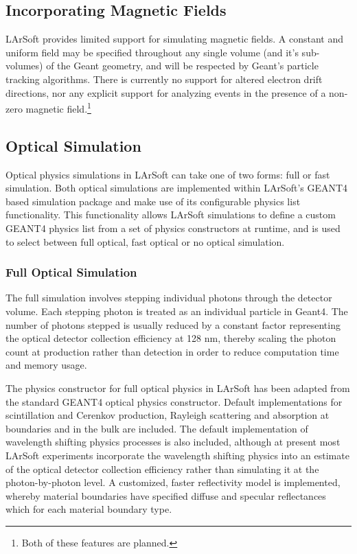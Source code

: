 \documentclass[12pt]{elsarticle}
\begin{document}
\subsection{Incorporating Magnetic Fields}
LArSoft provides limited support for simulating magnetic
fields. A constant and uniform field may be specified
throughout any single volume (and it's sub-volumes) of the Geant
geometry, and will be respected by Geant's particle tracking
algorithms. There is currently no support for altered electron
drift directions, nor any explicit support for analyzing events
in the presence of a non-zero magnetic field.\footnote{Both of these features are planned.}

\subsection{Optical Simulation}
Optical physics simulations in LArSoft can take one of two forms: full or fast simulation.  Both optical simulations are implemented within LArSoft's GEANT4 based simulation package and make use of its configurable physics list functionality.  This functionality allows LArSoft simulations to define a custom GEANT4 physics list from a set of physics constructors at runtime, and is used to select between full optical, fast optical or no optical simulation. 

\subsubsection{Full Optical Simulation}
The full simulation involves stepping individual photons through the detector volume.  Each stepping photon is treated as an individual particle in Geant4.  The number of photons stepped is usually reduced by a constant factor representing the optical detector collection efficiency at 128 nm, thereby scaling the photon count at production rather than detection in order to reduce computation time and memory usage. 

The physics constructor for full optical physics in LArSoft has been adapted from the standard GEANT4 optical physics constructor. Default implementations for scintillation and Cerenkov production, Rayleigh scattering and absorption at boundaries and in the bulk are included. The default implementation of wavelength shifting physics processes is also included, although at present most LArSoft experiments incorporate the wavelength shifting physics into an estimate of the optical detector collection efficiency rather than simulating it at the photon-by-photon level.  A customized, faster reflectivity model is implemented, whereby material boundaries have specified diffuse and specular reflectances which for each material boundary type.  
\end{document}
